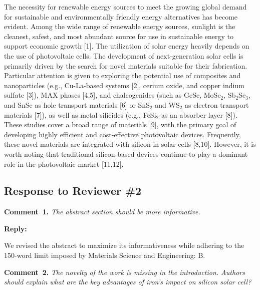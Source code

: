 \documentclass[a4paper,fleqn]{cas-sc}
\begin{document}
\begin{mdframed}
The necessity for renewable energy sources to meet the growing global demand for sustainable and environmentally friendly energy alternatives has become evident.
Among the wide range of renewable energy sources, sunlight is the cleanest, safest,
and most abundant source for use in sustainable energy to support economic growth [1].
The utilization of solar energy heavily depends on the use of photovoltaic cells.
\textcolor[rgb]{1.00,0.07,0.00}{
The development of next-generation solar cells is primarily driven by the search for novel materials suitable for their fabrication.
Particular attention is given to exploring the potential use of composites and nanoparticles
(e.g., Cu-La-based systems [2], cerium oxide, and copper indium sulfate [3]),
MAX phases [4,5],
and chalcogenides (such as GeSe, MoSe$_2$, Sb$_2$Se$_3$, and SnSe as hole transport materials [6]
or SnS$_2$ and WS$_2$ as electron transport materials [7]),
as well as metal silicides (e.g., FeSi$_2$ as an absorber layer [8]).
These studies cover a broad range of materials [9], with the primary goal of developing highly efficient and cost-effective photovoltaic devices.
Frequently, these novel materials are integrated with silicon in solar cells [8,10].
However, it is worth noting that traditional} silicon-based devices
\textcolor[rgb]{1.00,0.07,0.00}{continue} to play
\textcolor[rgb]{1.00,0.07,0.00}{a dominant role in the photovoltaic market} [11,12].
\end{mdframed}



\vspace{1cm}
\subsection*{Response to Reviewer \#2 }

\noindent
\textcolor[rgb]{0.00,0.50,1.00}{\textbf{Comment~1.}}
\emph{The abstract section should be more informative.}

\noindent
\textcolor[rgb]{0.51,0.00,0.00}{\textbf{Reply:}}

We revised the abstract to maximize its informativeness while adhering to the 150-word limit imposed by Materials Science and Engineering: B.


\vspace{1cm}
\noindent
\textcolor[rgb]{0.00,0.50,1.00}{\textbf{Comment~2.}}
\emph{The novelty of the work is missing in the introduction. Authors should explain what are the key advantages of iron's impact on silicon solar cell?}
\end{document}
